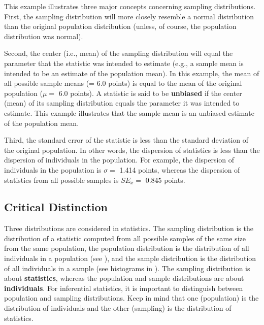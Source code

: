 \documentclass[10pt,openany]{book}\usepackage[]{graphicx}\usepackage[]{color}
\begin{document}
This example illustrates three major concepts concerning sampling distributions. First, the sampling distribution will more closely resemble a normal distribution than the original population distribution (unless, of course, the population distribution was normal).

Second, the center (i.e., mean) of the sampling distribution will equal the parameter that the statistic was intended to estimate (e.g., a sample mean is intended to be an estimate of the population mean). In this example, the mean of all possible sample means (= 6.0 points) is equal to the mean of the original population ($\mu=$ 6.0 points). A statistic is said to be \textbf{unbiased} if the center (mean) of its sampling distribution equals the parameter it was intended to estimate. This example illustrates that the sample mean is an unbiased estimate of the population mean.

Third, the standard error of the statistic is less than the standard deviation of the original population. In other words, the dispersion of statistics is less than the dispersion of individuals in the population. For example, the dispersion of individuals in the population is $\sigma=$ 1.414 points, whereas the dispersion of statistics from all possible samples is $SE_{\bar{x}}=$ 0.845 points.



\vspace{-12pt}
\subsection{Critical Distinction}
\vspace{-6pt}
Three distributions are considered in statistics. The sampling distribution is the distribution of a statistic computed from all possible samples of the same size from the same population, the population distribution is the distribution of all individuals in a population (see ), and the sample distribution is the distribution of all individuals in a sample (see histograms in ). The sampling distribution is about \textbf{statistics}, whereas the population and sample distributions are about \textbf{individuals}. For inferential statistics, it is important to distinguish between population and sampling distributions. Keep in mind that one (population) is the distribution of individuals and the other (sampling) is the distribution of statistics.
\end{document}
